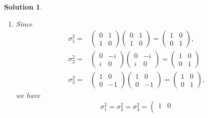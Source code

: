 \documentclass[UTF8,10pt,a4paper]{article}
\theoremstyle{Problem}
\theoremstyle{Solution}
\newtheorem*{sol}{Solution}
\begin{document}
\begin{sol}
    \begin{enumerate}
        \item[(a)] Since
        \begin{align}
            \sigma_1^2=&\left(\begin{matrix}
                0&1\\
                1&0
            \end{matrix}\right)\left(\begin{matrix}
                0&1\\
                1&0
            \end{matrix}\right)=\left(\begin{matrix}
                1&0\\
                0&1
            \end{matrix}\right),\\
            \sigma_2^2=&\left(\begin{matrix}
                0&-i\\
                i&0
            \end{matrix}\right)\left(\begin{matrix}
                0&-i\\
                i&0
            \end{matrix}\right)=\left(\begin{matrix}
                1&0\\
                0&1
            \end{matrix}\right)\\
            \sigma_3^2=&\left(\begin{matrix}
                1&0\\
                0&-1
            \end{matrix}\right)\left(\begin{matrix}
                1&0\\
                0&-1
            \end{matrix}\right)=\left(\begin{matrix}
                1&0\\
                0&1
            \end{matrix}\right),
        \end{align}
        we have
        \begin{equation}
            \sigma_1^2=\sigma_2^2=\sigma_3^2=\left(\begin{matrix}
                1&0\\

\end{matrix}
\end{equation}
\end{enumerate}
\end{sol}
\end{document}
